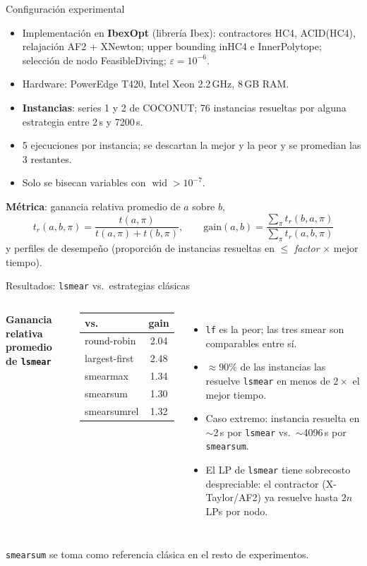 \documentclass[10pt,aspectratio=169]{beamer}
\newcommand{\wid}{\operatorname{wid}}
\newcommand{\ls}{\texttt{lsmear}}
\begin{document}
\begin{frame}{Configuración experimental}
\begin{itemize}
  \item Implementación en \textbf{IbexOpt} (librería Ibex): contractores HC4, ACID(HC4), relajación AF2 + XNewton; upper bounding inHC4 e InnerPolytope; selección de nodo FeasibleDiving; $\varepsilon=10^{-6}$.
  \item Hardware: PowerEdge T420, Intel Xeon 2.2\,GHz, 8\,GB RAM.
  \item \textbf{Instancias}: series 1 y 2 de COCONUT; 76 instancias resueltas por alguna estrategia entre 2\,s y 7200\,s.
  \item 5 ejecuciones por instancia; se descartan la mejor y la peor y se promedian las 3 restantes.
  \item Solo se bisecan variables con $\wid>10^{-7}$.
\end{itemize}
\vspace{1ex}
\textbf{Métrica}: ganancia relativa promedio de $a$ sobre $b$,
\[
t_r(a,b,\pi)=\frac{t(a,\pi)}{t(a,\pi)+t(b,\pi)},\qquad
\text{gain}(a,b)=\frac{\sum_\pi t_r(b,a,\pi)}{\sum_\pi t_r(a,b,\pi)}
\]
y perfiles de desempeño (proporción de instancias resueltas en $\le$ \emph{factor} $\times$ mejor tiempo).
\end{frame}

\begin{frame}{Resultados: \ls{} vs.\ estrategias clásicas}
\begin{columns}[T]
\textbf{Ganancia relativa promedio de \ls{}}
\begin{center}
\begin{tabular}{@{}lc@{}}
\toprule
vs.\ & gain \\ \midrule
round-robin  & 2.04 \\
largest-first & 2.48 \\
smearmax     & 1.34 \\
smearsum     & 1.30 \\
smearsumrel  & 1.32 \\
\bottomrule
\end{tabular}
\end{center}
\begin{itemize}
  \item \texttt{lf} es la peor; las tres smear son comparables entre sí.
  \item $\approx 90\%$ de las instancias las resuelve \ls{} en menos de $2\times$ el mejor tiempo.
  \item Caso extremo: instancia resuelta en $\sim$2\,s por \ls{} vs.\ $\sim$4096\,s por \texttt{smearsum}.
  \item El LP de \ls{} tiene sobrecosto despreciable: el contractor (X-Taylor/AF2) ya resuelve hasta $2n$ LPs por nodo.
\end{itemize}
\end{columns}
\vspace{1ex}
\texttt{smearsum} se toma como referencia clásica en el resto de experimentos.
\end{frame}
\end{document}
